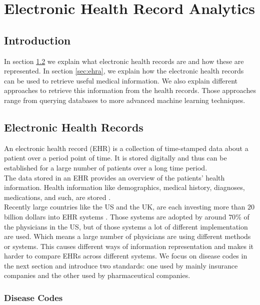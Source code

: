 \graphicspath{ {Context/Images/} }


\chapter{Electronic Health Record Analytics}
\label{cha:context}

\section{Introduction}

In section \ref{sec:ehr} we explain what electronic health records are and how these are represented. In section \ref{sec:ehra}, we explain how the electronic health records can be used to retrieve useful medical information. We also explain different approaches to retrieve this information from the health records. Those approaches range from querying databases to more advanced machine learning techniques.


\section{Electronic Health Records}
\label{sec:ehr}

An electronic health record (EHR) is a collection of time-stamped data about a patient over a period point of time. It is stored digitally and thus can be established for a large number of patients over a long time period. \\
The data stored in an EHR provides an overview of the patients' health information. Health information like demographics, medical history, diagnoses, medications, and such, are stored \cite{HealthIT:online}. \\

Recently large countries like the US and the UK, are each investing more than $20$ billion dollars into EHR systems \cite{EHRworld:article}. Those systems are adopted by around $70$\% of the physicians in the US, but of those systems a lot of different implementation are used. Which means a large number of physicians are using different methods or systems. This causes different ways of information representation and makes it harder to compare EHRs across different systems. We focus on disease codes in the next section and introduce two standards: one used by mainly insurance companies and the other used by pharmaceutical companies. 


\subsection{Disease Codes}
\label{sec:diseaseCodes}

